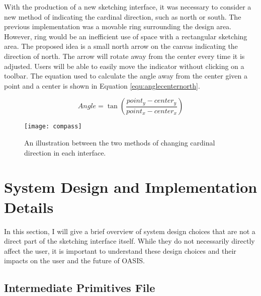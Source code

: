 With the production of a new sketching interface, it was necessary to consider a new method of indicating the cardinal direction, such as north or south. The previous implementation was a movable ring surrounding the design area. However, ring would be an inefficient use of space with a rectangular sketching area. The proposed idea is a small north arrow on the canvas indicating the direction of north. The arrow will rotate away from the center every time it is adjusted. Users will be able to easily move the indicator without clicking on a toolbar. The equation used to calculate the angle away from the center given a point and a center is shown in Equation \ref{equ:anglecenternorth}.

\begin{equation}
\label{equ:anglecenternorth}
Angle = \tan{(\dfrac{point_y - center_y}{point_x - center_x})}
\end{equation}

\begin{figure}[ht]
\centering
\texttt{[image: compass]}
\caption[Comparison of cardinal direction changes between interfaces]{An illustration between the two methods of changing cardinal direction in each interface.}
\label{fig:compass}
\end{figure}

\section{System Design and Implementation Details}

In this section, I will give a brief overview of system design choices that are not a direct part of the sketching interface itself. While they do not necessarily directly affect the user, it is important to understand these design choices and their impacts on the user and the future of OASIS.

\subsection{Intermediate Primitives File}

